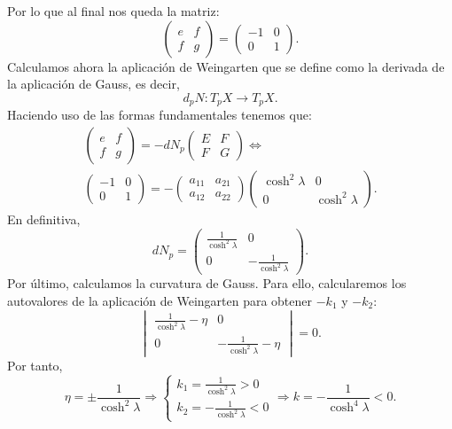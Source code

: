 Por lo que al final nos queda la matriz:
\[
    \begin{pmatrix} e & f\\ f & g \end{pmatrix} = \begin{pmatrix} -1 & 0\\ 0 &
1 \end{pmatrix}.
\]
Calculamos ahora la aplicación de Weingarten que se define como la derivada de
la aplicación de Gauss, es decir,
\[
d_p N: T_p X \rightarrow T_p X.
\]
Haciendo uso de las formas fundamentales tenemos que:
\begin{gather*}
    \begin{pmatrix} e & f\\ f & g \end{pmatrix} = -dN_p \begin{pmatrix} E & F\\
F & G\end{pmatrix} \Leftrightarrow\\
    \begin{pmatrix} -1 & 0\\ 0 & 1 \end{pmatrix} = -\begin{pmatrix} 
    a_{11} & a_{21}\\ a_{12} & a_{22} \end{pmatrix}
    \begin{pmatrix} \cosh^2 \lambda & 0\\ 0 & \cosh^2 \lambda\end{pmatrix}.
\end{gather*}
En definitiva,
\[
    dN_p = \begin{pmatrix} \frac{1}{\cosh^2 \lambda} & 0\\
    0 & -\frac{1}{\cosh^2 \lambda}\end{pmatrix}.
\]
Por último, calculamos la curvatura de Gauss. Para ello, calcularemos los
autovalores de la aplicación de Weingarten para obtener $-k_1$ y $-k_2$:
\[
    \begin{vmatrix} \frac{1}{\cosh^2 \lambda} - \eta & 0\\
    0 & -\frac{1}{\cosh^2 \lambda} - \eta \end{vmatrix} = 0.
\]
Por tanto,
\[
\eta = \pm \frac{1}{\cosh^2 \lambda} \Rightarrow \begin{cases}
    k_1 = \frac{1}{\cosh^2 \lambda} > 0\\
    k_2 = -\frac{1}{\cosh^2 \lambda} < 0
\end{cases} \Rightarrow \boxed{k = - \frac{1}{\cosh^4 \lambda} < 0}.
\]
